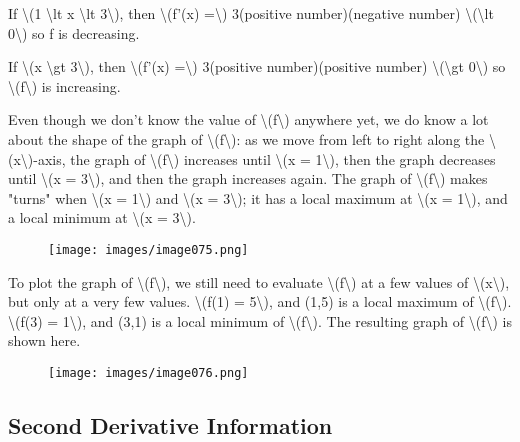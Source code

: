 If \textbackslash{}(1 \textbackslash{}lt x \textbackslash{}lt
3\textbackslash{}), then \textbackslash{}(f'(x) =\textbackslash{})
3(positive number)(negative number) \textbackslash{}(\textbackslash{}lt
0\textbackslash{}) so f is decreasing.

If \textbackslash{}(x \textbackslash{}gt 3\textbackslash{}), then
\textbackslash{}(f'(x) =\textbackslash{}) 3(positive number)(positive
number) \textbackslash{}(\textbackslash{}gt 0\textbackslash{}) so
\textbackslash{}(f\textbackslash{}) is increasing.

Even though we don't know the value of
\textbackslash{}(f\textbackslash{}) anywhere yet, we do know a lot about
the shape of the graph of \textbackslash{}(f\textbackslash{}): as we
move from left to right along the
\textbackslash{}(x\textbackslash{})-axis, the graph of
\textbackslash{}(f\textbackslash{}) increases until \textbackslash{}(x =
1\textbackslash{}), then the graph decreases until \textbackslash{}(x =
3\textbackslash{}), and then the graph increases again. The graph of
\textbackslash{}(f\textbackslash{}) makes "turns" when
\textbackslash{}(x = 1\textbackslash{}) and \textbackslash{}(x =
3\textbackslash{}); it has a local maximum at \textbackslash{}(x =
1\textbackslash{}), and a local minimum at \textbackslash{}(x =
3\textbackslash{}).

\begin{figure}
\centering
\texttt{[image: images/image075.png]}
\caption{}
\end{figure}

To plot the graph of \textbackslash{}(f\textbackslash{}), we still need
to evaluate \textbackslash{}(f\textbackslash{}) at a few values of
\textbackslash{}(x\textbackslash{}), but only at a very few values.
\textbackslash{}(f(1) = 5\textbackslash{}), and (1,5) is a local maximum
of \textbackslash{}(f\textbackslash{}). \textbackslash{}(f(3) =
1\textbackslash{}), and (3,1) is a local minimum of
\textbackslash{}(f\textbackslash{}). The resulting graph of
\textbackslash{}(f\textbackslash{}) is shown here.

\begin{figure}
\centering
\texttt{[image: images/image076.png]}
\caption{}
\end{figure}

\hypertarget{second-derivative-information}{%
\subsection{Second Derivative
Information}\label{second-derivative-information}}

